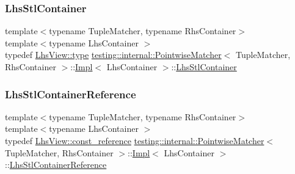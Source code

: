 \mbox{\label{classtesting_1_1internal_1_1_pointwise_matcher_1_1_impl_a23420b57b4cd6d83cec8afda746c27f2}} 
\subsubsection{\texorpdfstring{Lhs\+Stl\+Container}{LhsStlContainer}}
{\footnotesize\ttfamily template$<$typename Tuple\+Matcher, typename Rhs\+Container$>$ \\
template$<$typename Lhs\+Container $>$ \\
typedef \hyperlink{classtesting_1_1internal_1_1_stl_container_view_a2b2c63a6dcdbfe63fb0ee121ebf463ba}{Lhs\+View\+::type} \hyperlink{classtesting_1_1internal_1_1_pointwise_matcher}{testing\+::internal\+::\+Pointwise\+Matcher}$<$ Tuple\+Matcher, Rhs\+Container $>$\+::\hyperlink{classtesting_1_1internal_1_1_pointwise_matcher_1_1_impl}{Impl}$<$ Lhs\+Container $>$\+::\hyperlink{classtesting_1_1internal_1_1_pointwise_matcher_1_1_impl_a23420b57b4cd6d83cec8afda746c27f2}{Lhs\+Stl\+Container}}

\mbox{\label{classtesting_1_1internal_1_1_pointwise_matcher_1_1_impl_a9df3eb0866f76d59dbdd35fafeb5590c}} 
\subsubsection{\texorpdfstring{Lhs\+Stl\+Container\+Reference}{LhsStlContainerReference}}
{\footnotesize\ttfamily template$<$typename Tuple\+Matcher, typename Rhs\+Container$>$ \\
template$<$typename Lhs\+Container $>$ \\
typedef \hyperlink{classtesting_1_1internal_1_1_stl_container_view_a9cd4f6ed689b3938cdb7b3c4cbf1b36b}{Lhs\+View\+::const\+\_\+reference} \hyperlink{classtesting_1_1internal_1_1_pointwise_matcher}{testing\+::internal\+::\+Pointwise\+Matcher}$<$ Tuple\+Matcher, Rhs\+Container $>$\+::\hyperlink{classtesting_1_1internal_1_1_pointwise_matcher_1_1_impl}{Impl}$<$ Lhs\+Container $>$\+::\hyperlink{classtesting_1_1internal_1_1_pointwise_matcher_1_1_impl_a9df3eb0866f76d59dbdd35fafeb5590c}{Lhs\+Stl\+Container\+Reference}}

